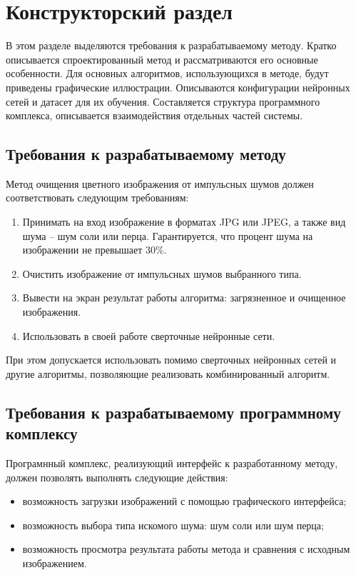 \section{Конструкторский раздел}
В этом разделе выделяются требования к разрабатываемому методу.
Кратко описывается спроектированный метод и рассматриваются его основные особенности.
Для основных алгоритмов, использующихся в методе, будут приведены графические иллюстрации.
Описываются конфигурации нейронных сетей и датасет для их обучения.
Составляется структура программного комплекса, описывается взаимодействия отдельных частей системы. 

\subsection{Требования к разрабатываемому методу}
Метод очищения цветного изображения от импульсных шумов должен соответствовать следующим требованиям:
\begin{enumerate}
	\item Принимать на вход изображение в форматах JPG или JPEG, а также вид шума -- шум соли или перца. 
	Гарантируется, что процент шума на изображении не превышает 30\%.
	\item Очистить изображение от импульсных шумов выбранного типа.
	\item Вывести на экран результат работы алгоритма: загрязненное и очищенное изображения.
	\item Использовать в своей работе сверточные нейронные сети.
\end{enumerate}

При этом допускается использовать помимо сверточных нейронных сетей и другие алгоритмы, позволяющие реализовать комбинированный алгоритм.

\subsection{Требования к разрабатываемому программному комплексу}
Програмнный комплекс, реализующий интерфейс к разработанному методу, должен позволять выполнять следующие действия:
\begin{itemize}
	\item возможность загрузки изображений с помощью графического интерфейса;
	\item возможность выбора типа искомого шума: шум соли или шум перца;
	\item возможность просмотра результата работы метода и сравнения с исходным изображением.
\end{itemize}

